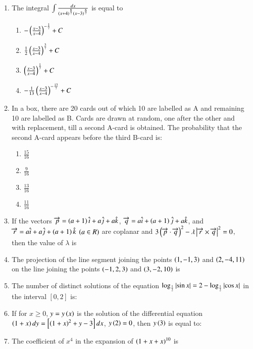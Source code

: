 \documentclass[journal]{IEEEtran}
\begin{document}
\begin{enumerate}
    \item The integral $\int\frac{dx}{\left(x+4\right)^{\frac{8}{7}}\left(x-3\right)^{\frac{6}{7}}}$ is equal to

		\begin{multicols}{4}
			\begin{enumerate}
				\item $-\left(\frac{x-3}{x-4}\right)^{-\frac{1}{7}}+C$
				\item $\frac{1}{2}\left(\frac{x-3}{x-4}\right)^{\frac{3}{7}}+C$
				\item $\left(\frac{x-3}{x-4}\right)^{\frac{1}{7}}+C$
				\item $-\frac{1}{13}\left(\frac{x-3}{x-4}\right)^{-\frac{13}{7}}+C$
			\end{enumerate}
		\end{multicols}

    \item In a box, there are 20 cards out of which 10 are labelled as A and remaining 10 are labelled as B. Cards are drawn at random, one after the other and with replacement, till a second A-card is obtained. The probability that the second A-card appears before the third B-card is:

		\begin{multicols}{4}
			\begin{enumerate}
				\item $\frac{15}{16}$
				\item $\frac{9}{16}$
				\item $\frac{13}{16}$
				\item $\frac{11}{16}$
			\end{enumerate}
		\end{multicols}

    \item If the vectors $\overrightarrow{p} = \left(a+1\right)\hat{i}+a\hat{j}+a\hat{k}$, $\overrightarrow{q} = a\hat{i}+\left(a+1\right)\hat{j}+a\hat{k}$, and $\overrightarrow{r} = a\hat{i}+a\hat{j}+\left(a+1\right)\hat{k}$ $\left(a\in R\right)$ are coplanar and $3\left(\overrightarrow{p}\cdot\overrightarrow{q}\right)^2 - \lambda\left\vert\overrightarrow{r}\times \overrightarrow{q}\right\vert^2=0$, then the value of $\lambda$ is

    \item The projection of the line segment joining the points $\left(1,-1,3\right)$ and $\left(2,-4,11\right)$ on the line joining the points $\left(-1,2,3\right)$ and $\left(3,-2,10\right)$ is
		
    \item The number of distinct solutions of the equation $\log_{\frac{1}{2}}\left\vert\sin x\right\vert = 2-\log_{\frac{1}{2}}\left\vert\cos x\right\vert$ in the interval $\left[0, 2\right]$ is:

    \item If for $x\geq 0$, $y=y\left(x\right)$ is the solution of the differential equation $\left(1+x\right)dy=\left[ \left(1+x\right)^2 +y-3\right]dx$, $y\left(2\right)=0$, then $y\left(3\right)$ is equal to:
	
    \item The coefficient of $x^4$ in the expansion of $\left(1+x+x\right)^{10}$ is

\end{enumerate}
\end{document}
